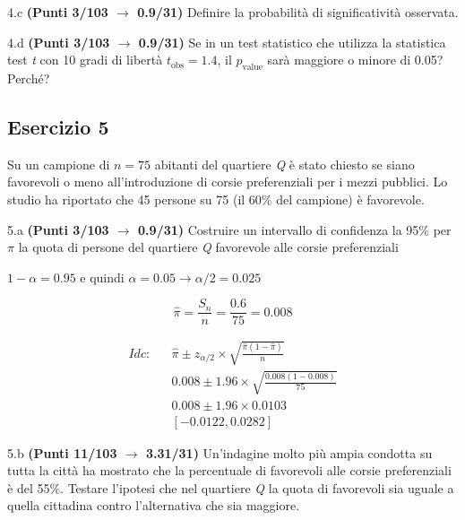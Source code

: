 \documentclass[
  11pt,
]{book}
\theoremstyle{mytheoremstyle}
\theoremstyle{mydefstyle}
\newenvironment{sol}
  {
  \begin{tcolorbox}[enhanced,breakable,arc=0.1mm,boxrule=1pt,colback=white,colframe=iblue,
  title=\bf \fontfamily{lmss}\selectfont \hspace{.5 cm} Soluzione,drop fuzzy shadow]

}{
\end{tcolorbox}
  }
\begin{document}
4.c \textbf{(Punti 3/103 \(\rightarrow\) 0.9/31)} Definire la probabilità di significatività osservata.

4.d \textbf{(Punti 3/103 \(\rightarrow\) 0.9/31)} Se in un test statistico che utilizza la statistica test \emph{t} con 10 gradi di libertà \(t_\text{obs}=1.4\), il \(p_\text{value}\) sarà maggiore o minore di 0.05? Perché?

\subsection{Esercizio 5}\label{esercizio-5-12}

Su un campione di \(n=75\) abitanti del quartiere \emph{Q} è stato chiesto se siano favorevoli o meno all'introduzione di corsie preferenziali per i mezzi pubblici. Lo studio ha riportato che 45 persone su 75 (il 60\% del campione) è favorevole.

5.a \textbf{(Punti 3/103 \(\rightarrow\) 0.9/31)} Costruire un intervallo di confidenza la 95\% per \(\pi\) la quota di persone del quartiere \emph{Q} favorevole alle corsie preferenziali

\begin{sol}
\(1-\alpha =0.95\) e quindi \(\alpha=0.05\rightarrow \alpha/2=0.025\)

\[
  \hat\pi = \frac{S_n}n = \frac{ 0.6 }{ 75 }= 0.008 
\]

\begin{eqnarray*}
  Idc: & &  \hat\pi \pm  z_{\alpha/2} \times \sqrt{\frac{\hat\pi(1-\hat\pi)}{n}} \\
     & &  0.008 \pm  1.96 \times \sqrt{\frac{ 0.008 (1- 0.008 )}{ 75 }} \\
     & &  0.008 \pm  1.96 \times  0.0103 \\
     & & [ -0.0122 ,  0.0282 ]
\end{eqnarray*}

\end{sol}

5.b \textbf{(Punti 11/103 \(\rightarrow\) 3.31/31)} Un'indagine molto più ampia condotta su tutta la città ha mostrato che
la percentuale di favorevoli alle corsie preferenziali è del 55\%. Testare l'ipotesi che nel quartiere \emph{Q} la quota di favorevoli sia uguale a quella cittadina contro l'alternativa che sia maggiore.
\end{document}
